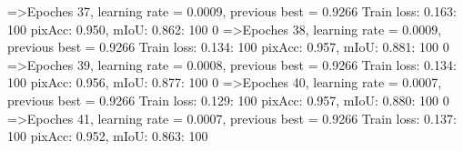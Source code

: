 =>Epoches 37, learning rate = 0.0009,                 previous best = 0.9266
Train loss: 0.163: 100%
pixAcc: 0.950, mIoU: 0.862: 100%
  0%
=>Epoches 38, learning rate = 0.0009,                 previous best = 0.9266
Train loss: 0.134: 100%
pixAcc: 0.957, mIoU: 0.881: 100%
  0%
=>Epoches 39, learning rate = 0.0008,                 previous best = 0.9266
Train loss: 0.134: 100%
pixAcc: 0.956, mIoU: 0.877: 100%
  0%
=>Epoches 40, learning rate = 0.0007,                 previous best = 0.9266
Train loss: 0.129: 100%
pixAcc: 0.957, mIoU: 0.880: 100%
  0%
=>Epoches 41, learning rate = 0.0007,                 previous best = 0.9266
Train loss: 0.137: 100%
pixAcc: 0.952, mIoU: 0.863: 100%
